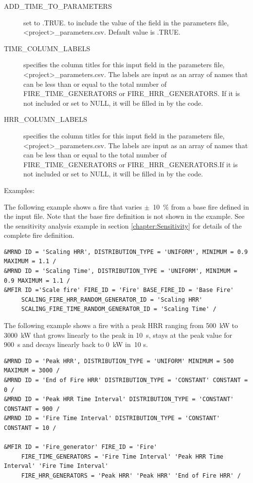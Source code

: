 \documentclass[12pt,twoside]{book}
\begin{document}
\begin{description}
  \item[ADD\_TIME\_TO\_PARAMETERS] set to .TRUE. to include the value of the field in the parameters file, {\ct <project>\_parameters.csv}. Default value is .TRUE.
  \item[TIME\_COLUMN\_LABELS] specifies the column titles for this input field in the parameters file, {\ct <project>\_parameters.csv}. The labels are input as an array of names that can be less than or equal to the total number of {\ct FIRE\_TIME\_GENERATORS} or {\ct FIRE\_HRR\_GENERATORS}. If it is not included or set to {\ct NULL}, it will be filled in by the code.
  \item[HRR\_COLUMN\_LABELS] specifies the column titles for this input field in the parameters file, {\ct <project>\_parameters.csv}. The labels are input as an array of names that can be less than or equal to the total number of {\ct FIRE\_TIME\_GENERATORS} or {\ct FIRE\_HRR\_GENERATORS}.If it is not included or set to {\ct NULL}, it will be filled in by the code.
\end{description}

\vspace{\baselineskip}
\noindent Examples:

The following example shows a fire that varies $\pm$~10~\% from a base fire defined in the input file.  Note that the base fire definition is not shown in the example. See the sensitivity analysis example in section \ref{chapter:Sensitivity} for details of the complete fire definition.

\begin{lstlisting}[language=cdata, basicstyle=\scriptsize]
&MRND ID = 'Scaling HRR', DISTRIBUTION_TYPE = 'UNIFORM', MINIMUM = 0.9 MAXIMUM = 1.1 /
&MRND ID = 'Scaling Time', DISTRIBUTION_TYPE = 'UNIFORM', MINIMUM = 0.9 MAXIMUM = 1.1 /
&MFIR ID ='Scale fire' FIRE_ID = 'Fire' BASE_FIRE_ID = 'Base Fire'
     SCALING_FIRE_HRR_RANDOM_GENERATOR_ID = 'Scaling HRR'
     SCALING_FIRE_TIME_RANDOM_GENERATOR_ID = 'Scaling Time' /
\end{lstlisting}

The following example shows a fire with a peak HRR ranging from 500~kW to 3000~kW that grows linearly to the peak in 10~s, stays at the peak value for 900~s and decays linearly back to 0~kW in~10 s.

\begin{lstlisting}[language=cdata, basicstyle=\scriptsize]
&MRND ID = 'Peak HRR', DISTRIBUTION_TYPE = 'UNIFORM' MINIMUM = 500 MAXIMUM = 3000 /
&MRND ID = 'End of Fire HRR' DISTRIBUTION_TYPE = 'CONSTANT' CONSTANT = 0 /
&MRND ID = 'Peak HRR Time Interval' DISTRIBUTION_TYPE = 'CONSTANT' CONSTANT = 900 /
&MRND ID = 'Fire Time Interval' DISTRIBUTION_TYPE = 'CONSTANT' CONSTANT = 10 /

&MFIR ID = 'Fire_generator' FIRE_ID = 'Fire'
     FIRE_TIME_GENERATORS = 'Fire Time Interval' 'Peak HRR Time Interval' 'Fire Time Interval'
     FIRE_HRR_GENERATORS = 'Peak HRR' 'Peak HRR' 'End of Fire HRR' /
\end{lstlisting}
\end{document}
